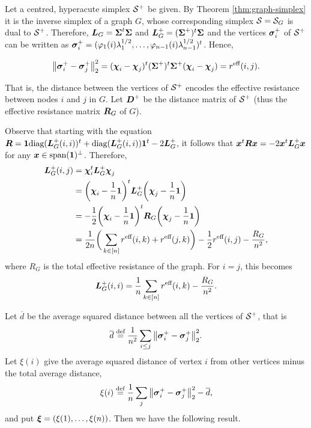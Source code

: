 Let a centred, hyperacute simplex $\mathcal{S}^+$ be given. By Theorem \ref{thm:graph-simplex} it is the inverse simplex of a graph $G$, whose corresponding simplex $\mathcal{S} = \mathcal{S}_G$ is dual to $\mathcal{S}^+$.
Therefore, $\vb*{L}_G=\boldsymbol{\Sigma}^t\boldsymbol{\Sigma}$ and $\vb*{L}_G^+=(\boldsymbol{\Sigma}^+)^t\boldsymbol{\Sigma}$ and the vertices $\vb*{\sigma}_i^+$ of $\mathcal{S}^+$ can be written as $\vb*{\sigma}_i^+=(\varphi_1(i)\lambda_1^{1/2},\dots,\varphi_{n-1}(i)\lambda_{n-1}^{1/2})^t$. Hence, 

\begin{align*}
\norm{\vb*{\sigma}_i^+-\vb*{\sigma}_j^+}_2^2 = (\boldsymbol{\chi}_i-\boldsymbol{\chi}_j)^t (\boldsymbol{\Sigma}^+)^t\boldsymbol{\Sigma}^+ (\boldsymbol{\chi}_i-\boldsymbol{\chi}_j) = r^{\text{eff}}(i,j).
\end{align*}

That is, the distance between the vertices of $\mathcal{S}^+$ encodes the effective resistance between nodes $i$ and $j$ in $G$. Let $\vb*{D}^+$ be the distance matrix of $\mathcal{S}^+$ (thus the effective resistance matrix $\vb*{R}_G$ of $G$). 


 Observe that starting with the equation $\vb*{R}=\vb{1}\text{diag}(\vb*{L}_G^+(i,i))^t + \text{diag}(\vb*{L}_G^+(i,i))\vb{1}^t - 2\vb*{L}_G^+$,  it follows that $\vb*{x}^t \vb*{R}\vb*{x} = -2\vb*{x}^t \vb*{L}_G^+\vb*{x}$ for any $\vb*{x}\in\textnormal{span}(\vb{1})^\perp$. Therefore, 
\begin{align*}
\vb*{L}_G^+(i,j)&=\boldsymbol{\chi}_i^t \vb*{L}_G^+\boldsymbol{\chi}_j \\
&= \bigg(\boldsymbol{\chi}_i-\frac{1}{n}\vb{1}\bigg)^t \vb*{L}_G^+\bigg(\boldsymbol{\chi}_j-\frac{1}{n}\vb{1}\bigg) \\
&= -\frac{1}{2}\bigg(\boldsymbol{\chi}_i-\frac{1}{n}\vb{1}\bigg)^t \vb*{R}_G\bigg(\boldsymbol{\chi}_j-\frac{1}{n}\vb{1}\bigg) \\
&= \frac{1}{2n}\bigg(\sum_{k\in[n]}r^{\text{eff}}(i,k)+r^{\text{eff}}(j,k)\bigg) - \frac{1}{2}r^{\text{eff}}(i,j) -\frac{R_G}{n^2},
\end{align*}
where $R_G$ is the total effective resistance of the graph. 
For $i=j$, this becomes 
\begin{align*}
\vb*{L}_G^+(i,i) = \frac{1}{n} \sum_{k\in[n]}r^{\text{eff}}(i,k) - \frac{R_G}{n^2}.
\end{align*}

Let $\overline{d}$ be the average squared distance between all the vertices of $\mathcal{S}^+$, that is
\[\overline{d} \overset{\text{def}}{=}  \frac{1}{n^2}\sum_{i\leq j} \norm{\vb*{\sigma}_i^+-\vb*{\sigma}_j^+}_2^2.\]
Let $\xi(i)$ give the average squared distance of vertex $i$ from other vertices minus the total average distance, 
\[\xi(i) \overset{\text{def}}{=} \frac{1}{n}\sum_{j} \norm{\vb*{\sigma}_i^+-\vb*{\sigma}_j^+}_2^2 - \overline{d},\]
and put $\vb*{\xi}=(\xi(1),\dots,\xi(n))$. 
Then we have the following result. 

